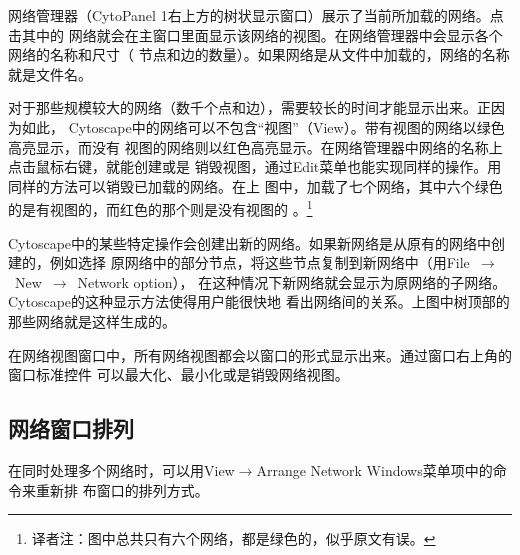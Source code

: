     网络管理器（CytoPanel 1右上方的树状显示窗口）展示了当前所加载的网络。点击其中的
    网络就会在主窗口里面显示该网络的视图。在网络管理器中会显示各个网络的名称和尺寸（
    节点和边的数量）。如果网络是从文件中加载的，网络的名称就是文件名。
    
    对于那些规模较大的网络（数千个点和边），需要较长的时间才能显示出来。正因为如此， 
    Cytoscape中的网络可以不包含“视图”（View）。带有视图的网络以绿色高亮显示，而没有
    视图的网络则以红色高亮显示。在网络管理器中网络的名称上点击鼠标右键，就能创建或是
    销毁视图，通过Edit菜单也能实现同样的操作。用同样的方法可以销毁已加载的网络。在上
    图中，加载了七个网络，其中六个绿色的是有视图的，而红色的那个则是没有视图的 
    。\footnote{译者注：图中总共只有六个网络，都是绿色的，似乎原文有误。}

Cytoscape中的某些特定操作会创建出新的网络。如果新网络是从原有的网络中创建的，例如选择
原网络中的部分节点，将这些节点复制到新网络中（用File~$\to$~New~$\to$~Network option），
在这种情况下新网络就会显示为原网络的子网络。Cytoscape的这种显示方法使得用户能很快地
看出网络间的关系。上图中树顶部的那些网络就是这样生成的。

在网络视图窗口中，所有网络视图都会以窗口的形式显示出来。通过窗口右上角的窗口标准控件
可以最大化、最小化或是销毁网络视图。

    \subsection{网络窗口排列}

在同时处理多个网络时，可以用View$\to$Arrange Network Windows菜单项中的命令来重新排
布窗口的排列方式。

